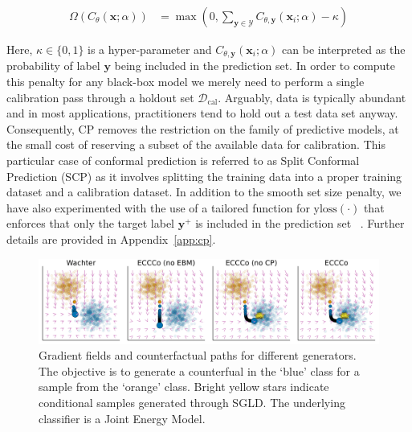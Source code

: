 \documentclass{article}
\begin{document}
\begin{equation}\label{eq:setsize}
  \begin{aligned}
    \Omega(C_{\theta}(\mathbf{x};\alpha))&=\max \left(0, \sum_{\mathbf{y}\in\mathcal{Y}}C_{\theta,\mathbf{y}}(\mathbf{x}_i;\alpha) - \kappa \right)
  \end{aligned}
\end{equation}

Here, $\kappa \in \{0,1\}$ is a hyper-parameter and $C_{\theta,\mathbf{y}}(\mathbf{x}_i;\alpha)$ can be interpreted as the probability of label $\mathbf{y}$ being included in the prediction set. In order to compute this penalty for any black-box model we merely need to perform a single calibration pass through a holdout set $\mathcal{D}_{\text{cal}}$. Arguably, data is typically abundant and in most applications, practitioners tend to hold out a test data set anyway. Consequently, CP removes the restriction on the family of predictive models, at the small cost of reserving a subset of the available data for calibration. This particular case of conformal prediction is referred to as Split Conformal Prediction (SCP) as it involves splitting the training data into a proper training dataset and a calibration dataset. In addition to the smooth set size penalty, we have also experimented with the use of a tailored function for $\text{yloss}(\cdot)$ that enforces that only the target label $\mathbf{y}^+$ is included in the prediction set ~\citet{stutz2022learning}. Further details are provided in Appendix~\ref{app:cp}.

\begin{figure}
  \centering
  \includegraphics[width=1.0\textwidth]{../artifacts/results/images/poc_gradient_fields.png}
  \caption{Gradient fields and counterfactual paths for different generators. The objective is to generate a counterfual in the `blue' class for a sample from the `orange' class. Bright yellow stars indicate conditional samples generated through SGLD. The underlying classifier is a Joint Energy Model.}\label{fig:poc}
\end{figure}

\renewcommand{\algorithmicrequire}{\textbf{Input:}}
\renewcommand{\algorithmicensure}{\textbf{Output:}}
\end{document}
